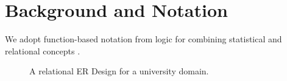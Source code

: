 \documentclass{vldb}
\begin{document}
%

\section{Background and Notation}
We adopt function-based notation from logic for combining statistical and relational concepts \cite{Russell2010,Poole2003,Getoor2006,Chiang2012}.


\begin{figure}[htbp] %
 \centering
{} 
\caption{A relational ER Design for a university domain.}
 \label{fig:university-schema}
\end{figure}
\end{document}
